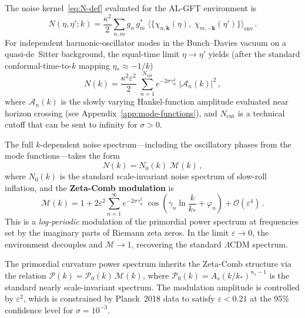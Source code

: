 \documentclass[12pt,a4paper]{article}
\begin{document}
The noise kernel~\eqref{eq:N-def} evaluated for the AL-GFT
environment is
\begin{equation}\label{eq:N-ALGFT}
  N(\eta,\eta';k)
  = \frac{\kappa^{2}}{2}\sum_{n,m}g_{n}\,g_{m}^{*}\;
    \bigl\langle\bigl\{\chi_{n,\mathbf{k}}(\eta),\;
    \chi_{m,-\mathbf{k}}(\eta')\bigr\}\bigr\rangle_{\mathrm{env}}\,.
\end{equation}
For independent harmonic-oscillator modes in the Bunch--Davies vacuum
on a quasi-de~Sitter background, the equal-time limit
$\eta\to\eta'$ yields (after the standard conformal-time-to-$k$
mapping $\eta_{*}\approx -1/k$)
\begin{equation}\label{eq:Nk-sum}
  N(k)
  = \frac{\kappa^{2}\varepsilon^{2}}{2}\;
    \sum_{n=1}^{N_{\mathrm{cut}}}
    e^{-2\sigma\gamma_{n}^{2}}\;
    \left|\mathcal{A}_{n}(k)\right|^{2}\,,
\end{equation}
where $\mathcal{A}_{n}(k)$ is the slowly varying Hankel-function
amplitude evaluated near horizon crossing (see
Appendix~\ref{app:mode-functions}), and $N_{\mathrm{cut}}$ is a
technical cutoff that can be sent to infinity for $\sigma>0$.

The full $k$-dependent noise spectrum---including the oscillatory
phases from the mode functions---takes the form
\begin{equation}\label{eq:Nk-full}
  \boxed{
  N(k)
  = N_{0}(k)\;\mathcal{M}(k)\,,}
\end{equation}
where $N_{0}(k)$ is the standard scale-invariant noise spectrum of
slow-roll inflation, and the \textbf{Zeta-Comb modulation} is
\begin{equation}\label{eq:Mk}
  \boxed{
  \mathcal{M}(k)
  = 1 + 2\varepsilon^{2}\sum_{n=1}^{\infty}
    e^{-2\sigma\gamma_{n}^{2}}\;
    \cos\!\left(\gamma_{n}\ln\frac{k}{k_{*}}+\varphi_{n}\right)
    + \mathcal{O}(\varepsilon^{4})\,.}
\end{equation}
This is a \emph{log-periodic} modulation of the primordial power
spectrum at frequencies set by the imaginary parts of Riemann zeta
zeros.  In the limit $\varepsilon\to 0$, the environment decouples
and $\mathcal{M}\to 1$, recovering the standard $\Lambda$CDM
spectrum.

\begin{remark}
The primordial curvature power spectrum inherits the Zeta-Comb
structure via the relation $\mathcal{P}(k)=\mathcal{P}_{0}(k)\,\mathcal{M}(k)$,
where $\mathcal{P}_{0}(k)=A_{s}(k/k_{*})^{n_{s}-1}$ is the standard
nearly scale-invariant spectrum.  The modulation amplitude is
controlled by $\varepsilon^{2}$, which is constrained by Planck~2018
data to satisfy $\varepsilon<0.21$ at the 95\% confidence level for
$\sigma=10^{-3}$.
\end{remark}
\end{document}
